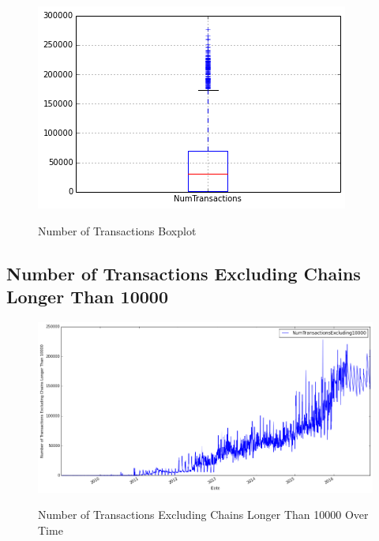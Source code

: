 \begin{figure}[bth]
  \myfloatalign
  {\includegraphics[width=1\linewidth]
    {gfx/n-transactions-boxplot}}
  \caption{Number of Transactions Boxplot}
  \label{fig:n-transactions-boxplot}
\end{figure}

\clearpage

\subsection{Number of Transactions Excluding Chains Longer Than 10000}
\label{sec:n-transactions-excluding-chains-longer-than-10000}

\begin{figure}[bth]
  \myfloatalign
  {\includegraphics[width=1\linewidth]
    {gfx/n-transactions-excluding-chains-longer-than-10000-over-time}}
  \caption{Number of Transactions Excluding Chains Longer Than 10000 Over Time}
  \label{fig:n-transactions-excluding-chains-longer-than-10000-over-time}
\end{figure}

